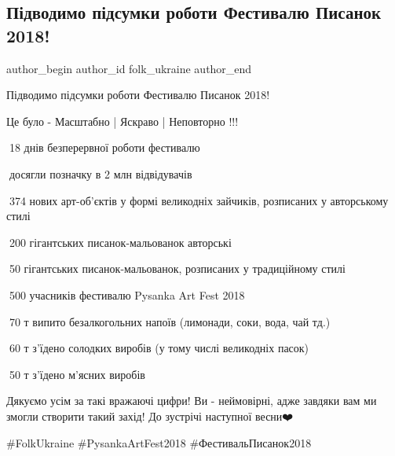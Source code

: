  
 
 
 
 

\subsection{Підводимо підсумки роботи Фестивалю Писанок 2018!}
\label{sec:23_04_2018.fb.folk_ukraine.1.pidvodymo_pidsumky_festyvalju_pysanok_2018}

\ifcmt
 author_begin
   author_id folk_ukraine
 author_end
\fi

Підводимо підсумки роботи Фестивалю Писанок 2018!

Це було - Масштабно |  Яскраво  |  Неповторно !!!

🔸18 днів безперервної роботи фестивалю\par
🔸досягли позначку в 2 млн відвідувачів \par
🔸374 нових арт-об'єктів у формі великодніх зайчиків, розписаних у авторському стилі\par
🔸200 гігантських писанок-мальованок авторські\par
🔸50 гігантських писанок-мальованок, розписаних у традиційному стилі\par
🔸500 учасників фестивалю Pysanka Art Fest 2018\par
🔸70 т випито безалкогольних напоїв (лимонади, соки, вода, чай тд.)\par
🔸60 т з'їдено солодких виробів (у тому числі великодніх пасок)\par
🔸50 т з'їдено м'ясних виробів\par

Дякуємо усім за такі вражаючі цифри! Ви - неймовірні, адже завдяки вам ми
змогли створити такий захід! До зустрічі наступної весни❤️ 

\#FolkUkraine \#PysankaArtFest2018 \#ФестивальПисанок2018

